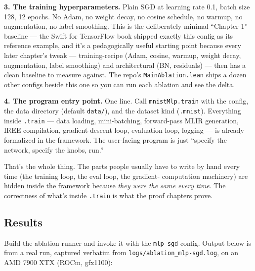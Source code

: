 \textbf{3. The training hyperparameters.} Plain SGD at learning rate
0.1, batch size 128, 12 epochs. No Adam, no weight decay, no cosine
schedule, no warmup, no augmentation, no label smoothing. This is
the deliberately minimal ``Chapter 1'' baseline --- the Swift for
TensorFlow book shipped exactly this config as its reference
example, and it's a pedagogically useful starting point because
every later chapter's tweak --- training-recipe (Adam, cosine,
warmup, weight decay, augmentation, label smoothing) and
architectural (BN, residuals) --- then has a clean baseline to
measure against. The repo's
\texttt{MainAblation.lean} ships a dozen other configs beside this
one so you can run each ablation and see the delta.

\textbf{4. The program entry point.} One line. Call
\texttt{mnistMlp.train} with the config, the data directory (default
\texttt{data/}), and the dataset kind (\texttt{.mnist}). Everything
inside \texttt{.train} --- data loading, mini-batching, forward-pass
MLIR generation, IREE compilation, gradient-descent loop, evaluation
loop, logging --- is already formalized in the framework. The
user-facing program is just ``specify the network, specify the
knobs, run.''

That's the whole thing. The parts people usually have to write by
hand every time (the training loop, the eval loop, the gradient-
computation machinery) are hidden inside the framework because
\emph{they were the same every time}. The correctness of what's
inside \texttt{.train} is what the proof chapters prove.

\subsection*{Results}

Build the ablation runner and invoke it with the \texttt{mlp-sgd}
config. Output below is from a real run, captured verbatim from
\texttt{logs/ablation\_mlp-sgd.log}, on an AMD 7900 XTX (ROCm,
gfx1100):

